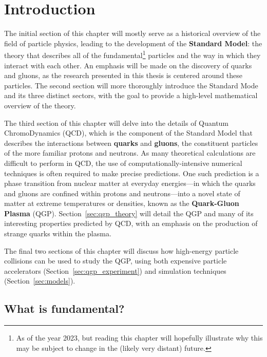 \chapter{Introduction}
\label{ch:introduction}

The initial section of this chapter will mostly serve as a historical overview of the field of particle physics, leading to the development of the \textbf{Standard Model}: the theory that describes all of the fundamental\footnote{As of the year 2023, but reading this chapter will hopefully illustrate why this may be subject to change in the (likely very distant) future.} particles and the way in which they interact with each other. An emphasis will be made on the discovery of quarks and gluons, as the research presented in this thesis is centered around these particles. The second section will more thoroughly introduce the Standard Mode and its three distinct sectors, with the goal to provide a high-level mathematical overview of the theory.

The third section of this chapter will delve into the details of Quantum ChromoDynamics (QCD), which is the component of the Standard Model that describes the interactions between \textbf{quarks} and \textbf{gluons}, the constituent particles of the more familiar protons and neutrons. As many theoretical calculations are difficult to perform in QCD, the use of computationally-intensive numerical techniques is often required to make precise predictions. One such prediction is a phase transition from nuclear matter at everyday energies---in which the quarks and gluons are confined within protons and neutrons---into a novel state of matter at extreme temperatures or densities, known as the \textbf{Quark-Gluon Plasma} (QGP). Section~\ref{sec:qgp_theory} will detail the QGP and many of its interesting properties predicted by QCD, with an emphasis on the production of strange quarks within the plasma.

The final two sections of this chapter will discuss how high-energy particle collisions can be used to study the QGP, using both expensive particle accelerators (Section~\ref{sec:qgp_experiment}) and simulation techniques (Section~\ref{sec:models}). 

\clearpage

\section{What is fundamental?}
\label{sec:fundamental}

